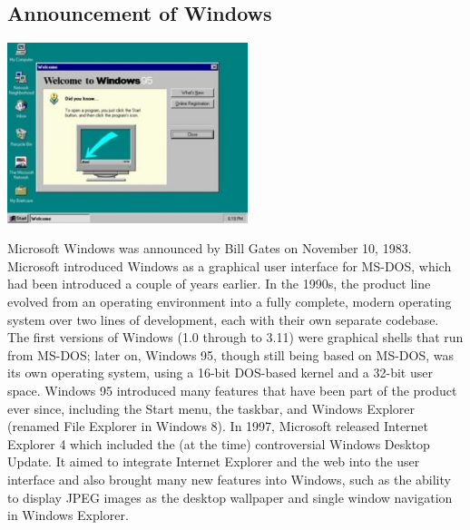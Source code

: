 \documentclass[11pt]{report}
\begin{document}
\subsection{Announcement of Windows}
\vspace{2mm}\begin{center}\includegraphics[width=7cm]{./img/windows.jpg}\end{center}
Microsoft Windows was announced by Bill Gates on November 10, 1983. Microsoft introduced Windows as a graphical user interface for MS-DOS, which had been introduced a couple of years earlier. In the 1990s, the product line evolved from an operating environment into a fully complete, modern operating system over two lines of development, each with their own separate codebase.\\
The first versions of Windows (1.0 through to 3.11) were graphical shells that run from MS-DOS; later on, Windows 95, though still being based on MS-DOS, was its own operating system, using a 16-bit DOS-based kernel and a 32-bit user space. Windows 95 introduced many features that have been part of the product ever since, including the Start menu, the taskbar, and Windows Explorer (renamed File Explorer in Windows 8). In 1997, Microsoft released Internet Explorer 4 which included the (at the time) controversial Windows Desktop Update. It aimed to integrate Internet Explorer and the web into the user interface and also brought many new features into Windows, such as the ability to display JPEG images as the desktop wallpaper and single window navigation in Windows Explorer.

\end{document}
